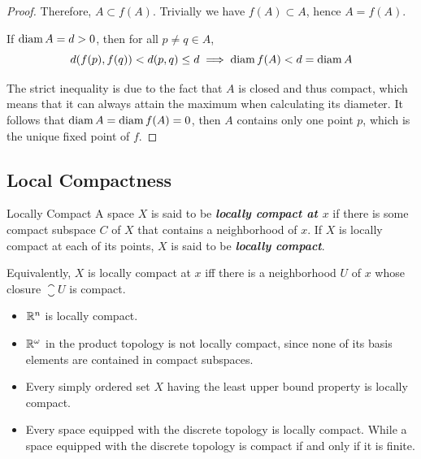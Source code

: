 \documentclass[12pt,a4paper]{article}
\begin{document}
\begin{ex}
\begin{itemize}
\begin{proof}
                Therefore, $A\subset f(A)$. Trivially we have $f(A)\subset A$, hence $A=f(A)$.

                If $\operatorname{diam} A=d>0$, then for all $p\neq q\in A$, 
                $$
                d(f(p),f(q))<d(p,q)\leq d\implies \operatorname{diam} f(A)<d=\operatorname{diam} A
                $$
                
                The strict inequality is due to the fact that $A$ is closed and thus compact, which means that it can always attain the maximum when calculating its diameter. It follows that $\operatorname{diam} A=\operatorname{diam} f(A)=0$, then $A$ contains only one point $p$, which is the unique fixed point of $f$.
            \end{proof}
        \end{itemize}
    \end{ex}
    \hfill

    \subsection{Local Compactness}
    \begin{defi}{Locally Compact}
        A space $X$ is said to be \textbf{\textit{locally compact at $x$}} if there is some compact subspace $C$ of $X$ that contains a neighborhood of $x$. If $X$ is locally compact at each of its points, $X$ is said to be \textbf{\textit{locally compact}}.
    \end{defi}
    \begin{remark}
        Equivalently, $X$ is locally compact at $x$ iff there is a neighborhood $U$ of $x$ whose closure $\closure{U}$ is compact. 
    \end{remark}
    \hfill
    
    \begin{eg}\hfill
    
        \begin{itemize}
            \item $\mathbb{R}^n$ is locally compact.
            \item $\mathbb{R}^\omega$ in the product topology is not locally compact, since none of its basis elements are contained in compact subspaces.
            \item Every simply ordered set $X$ having the least upper bound property is locally compact.
            \item Every space equipped with the discrete topology is locally compact. While a space equipped with the discrete topology is compact if and only if it is finite.
        \end{itemize}
    \end{eg}
    \hfill
\end{document}
